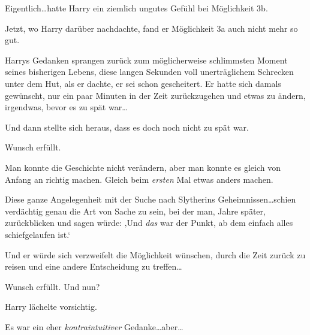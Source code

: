 Eigentlich…hatte Harry ein ziemlich ungutes Gefühl bei Möglichkeit 3b.

Jetzt, wo Harry darüber nachdachte, fand er Möglichkeit 3a auch nicht mehr so gut.

Harrys Gedanken sprangen zurück zum möglicherweise schlimmsten Moment seines bisherigen Lebens, diese langen Sekunden voll unerträglichem Schrecken unter dem Hut, als er dachte, er sei schon gescheitert. Er hatte sich damals gewünscht, nur ein paar Minuten in der Zeit zurückzugehen und etwas zu ändern, irgendwas, bevor es zu spät war…

Und dann stellte sich heraus, dass es doch noch nicht zu spät war.

Wunsch erfüllt.

Man konnte die Geschichte nicht verändern, aber man konnte es gleich von Anfang an richtig machen. Gleich beim \emph{ersten} Mal etwas anders machen.

Diese ganze Angelegenheit mit der Suche nach Slytherins Geheimnissen…schien verdächtig genau die Art von Sache zu sein, bei der man, Jahre später, zurückblicken und sagen würde: ‚Und \emph{das} war der Punkt, ab dem einfach alles schiefgelaufen ist.‘

Und er würde sich verzweifelt die Möglichkeit wünschen, durch die Zeit zurück zu reisen und eine andere Entscheidung zu treffen…

Wunsch erfüllt. Und nun?

Harry lächelte vorsichtig.

Es war ein eher \emph{kontraintuitiver} Gedanke…aber…

